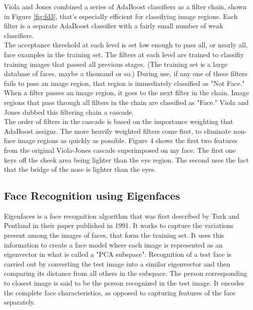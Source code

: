 \documentclass[12pt]{article}			%
\begin{document}
Viola and Jones combined a series of AdaBoost classifiers as a filter chain, shown in Figure \ref{fig:fd3}, that's especially efficient for classifying image regions. Each filter is a separate AdaBoost classifier with a fairly small number of weak classifiers.\\
The acceptance threshold at each level is set low enough to pass all, or nearly all, face examples in the training set. The filters at each level are trained to classifiy training images that passed all previous stages. (The training set is a large database of faces, maybe a thousand or so.) During use, if any one of these filters fails to pass an image region, that region is immediately classified as "Not Face." When a filter passes an image region, it goes to the next filter in the chain. Image regions that pass through all filters in the chain are classified as "Face." Viola and Jones dubbed this filtering chain a cascade.\\
The order of filters in the cascade is based on the importance weighting that AdaBoost assigns. The more heavily weighted filters come first, to eliminate non-face image regions as quickly as possible. Figure 4 shows the first two features from the original Viola-Jones cascade superimposed on my face. The first one keys off the cheek area being lighter than the eye region. The second uses the fact that the bridge of the nose is lighter than the eyes.


\subsection{ Face Recognition using Eigenfaces }
Eigenfaces is a face recognition algorithm that was first described by Turk and Pentland in their paper published in 1991. It works to capture the variations present among the images of faces, that form the training set. It uses this information to create a face model where each image is represented as an eigenvector in what is called a "PCA subspace". Recognition of a test face is carried out by converting the test image into a similar eigenvector and then comparing its distance from all others in the subspace. The person corresponding to closest image is said to be the person recognized in the test image. It encodes the complete face characteristics, as opposed to capturing features of the face separately.\\
\end{document}
